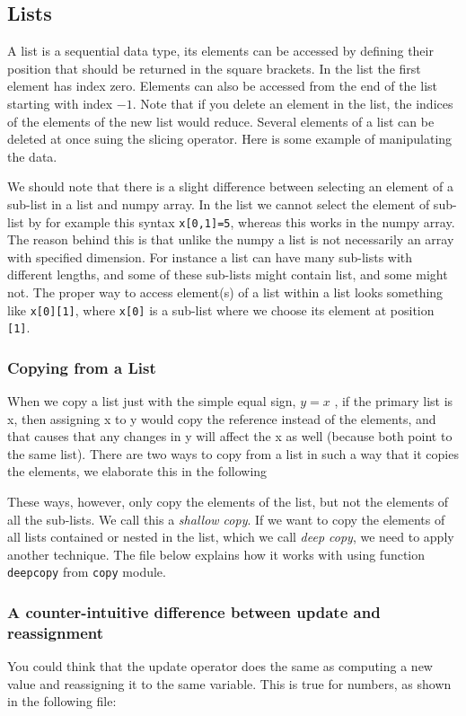 \documentclass[10pt,a4paper]{article}
\begin{document}
\subsection{Lists}
A list is a sequential data type, its elements can be accessed by defining their position that should be returned in the square brackets. In the list the first element has index zero. Elements can also be accessed from the end of the list starting with index $-1$. Note that if you delete an element in the list, the indices of the elements of the new list  would reduce. Several elements of a list can be deleted at once suing the slicing operator.  Here is some example of manipulating the data. 

We should note that there is a slight difference between selecting an element of a sub-list in a list and numpy array. 
In the list we cannot select the element of sub-list by for example this syntax \texttt{x[0,1]=5}, whereas this works in the numpy array.
The reason behind this is that unlike the numpy a list is not necessarily an array with specified dimension. For instance a list can have many sub-lists with different lengths, and some of these sub-lists might contain list, and some might not. The proper way to access element(s) of a list within a list looks something like \texttt{x[0][1]}, where \texttt{x[0]} is a sub-list where we choose its element at position \texttt{[1]}.


\subsubsection{Copying from a List}
When we copy a list just with the simple equal sign, $y=x$ , if the primary list is x, then assigning x to y would copy the reference instead of the elements, and that causes that any changes in y will affect the x as well (because both point to the same list).
There are two ways to copy from a list in such a way that it copies the elements, we elaborate this in the following 

These ways, however, only copy the elements of the list, but not the elements of all the sub-lists. We call this a \textit{shallow copy}. If we want to copy the elements of all lists contained or nested in the list, which we call \textit{deep copy}, we need to apply another technique. The file below explains how it works with using function \texttt{deepcopy} from \texttt{copy} module.



\subsubsection{A counter-intuitive difference between update and reassignment}
You could think that the update operator does the same as computing a new value and reassigning it to the same variable. This is true for numbers, as shown in the following file:

\end{document}
